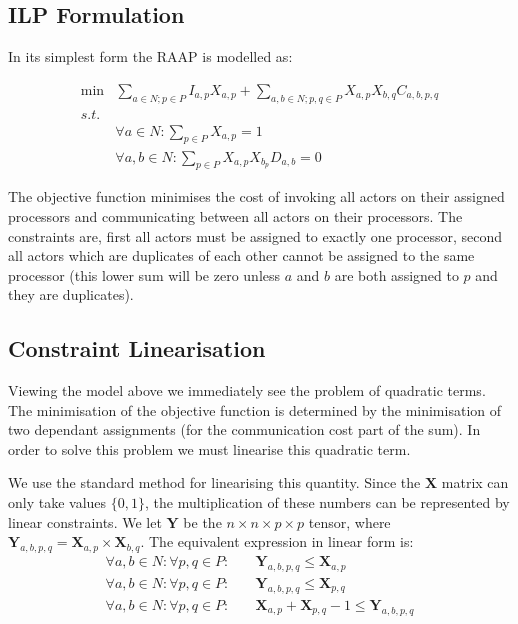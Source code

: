 \subsection{ILP Formulation}

In its simplest form the RAAP is modelled as:

\begin{align}
	\nonumber \min & \sum_{a \in N; p \in P} I_{a,p}X_{a,p} + \sum_{a,b \in N; p,q \in P} X_{a,p}X_{b,q}C_{a,b,p,q} \\
	\nonumber s.t. &  \\
	\nonumber & \forall a \in N : \sum_{p \in P}X_{a,p} = 1 \\
	\nonumber & \forall a,b \in N : \sum_{p \in P}X_{a,p}X_{b_p}D_{a,b} = 0
\end{align}

The objective function minimises the cost of invoking all actors on their assigned processors and communicating between all actors on their processors.
The constraints are, first all actors must be assigned to exactly one processor, second all actors which are duplicates of each other cannot be assigned to the same processor (this lower sum will be zero unless $a$ and $b$ are both assigned to $p$ and they are duplicates).

\subsection{Constraint Linearisation}

Viewing the model above we immediately see the problem of quadratic terms.
The minimisation of the objective function is determined by the minimisation of two dependant assignments (for the communication cost part of the sum).
In order to solve this problem we must linearise this quadratic term.

We use the standard method for linearising this quantity.
Since the $\mathbf{X}$ matrix can only take values $\{0, 1\}$, the multiplication of these numbers can be represented by linear constraints.
We let $\mathbf{Y}$ be the $n \times n \times p \times p$ tensor, where $\mathbf{Y}_{a,b,p,q} = \mathbf{X}_{a,p} \times \mathbf{X}_{b,q}$.
The equivalent expression in linear form is:
\begin{align}
	\nonumber \forall a,b \in N : \forall p,q \in P : \quad & \mathbf{Y}_{a,b,p,q} \leq \mathbf{X}_{a,p} \\
	\nonumber \forall a,b \in N : \forall p,q \in P : & \mathbf{Y}_{a,b,p,q} \leq \mathbf{X}_{p,q} \\
	\nonumber \forall a,b \in N : \forall p,q \in P : & \mathbf{X}_{a,p} + \mathbf{X}_{p,q} - 1 \leq \mathbf{Y}_{a,b,p,q}
\end{align}

